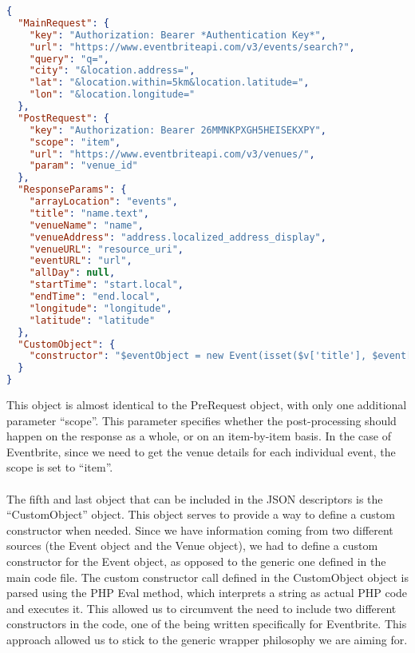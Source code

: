 \begin{lstlisting}[language=json,firstnumber=1]
{
  "MainRequest": {
    "key": "Authorization: Bearer *Authentication Key*",
    "url": "https://www.eventbriteapi.com/v3/events/search?",
    "query": "q=",
    "city": "&location.address=",
    "lat": "&location.within=5km&location.latitude=",
    "lon": "&location.longitude="
  },
  "PostRequest": {
    "key": "Authorization: Bearer 26MMNKPXGH5HEISEKXPY",
    "scope": "item",
    "url": "https://www.eventbriteapi.com/v3/venues/",
    "param": "venue_id"
  },
  "ResponseParams": {
    "arrayLocation": "events",
    "title": "name.text",
    "venueName": "name",
    "venueAddress": "address.localized_address_display",
    "venueURL": "resource_uri",
    "eventURL": "url",
    "allDay": null,
    "startTime": "start.local",
    "endTime": "end.local",
    "longitude": "longitude",
    "latitude": "latitude"
  },
  "CustomObject": {
    "constructor": "$eventObject = new Event(isset($v['title'], $event[$v['title']]) ? $event[$v['title']] : '', isset($v['venueName'], $postObject[$v['venueName']]) ? $postObject[$v['venueName']] : '', isset($v['venueAddress'], $postObject[$v['venueAddress']]) ? $postObject[$v['venueAddress']] : '', isset($v['venueURL'], $postObject[$v['venueURL']]) ? $postObject[$v['venueURL']] : '', isset($v['eventURL'], $event[$v['eventURL']]) ? $event[$v['eventURL']] : '', isset($v['allDay'], $event[$v['allDay']]) ? $event[$v['allDay']] : '', isset($v['startTime'], $event[$v['startTime']]) ? $event[$v['startTime']] : '', isset($v['endTime'], $event[$v['endTime']]) ? $event[$v['endTime']] : '', isset($v['latitude'], $postObject[$v['latitude']]) ? $postObject[$v['latitude']] : '', isset($v['longitude'], $postObject[$v['longitude']]) ? $postObject[$v['longitude']] : '');"
  }
}
\end{lstlisting}
This object is almost identical to the PreRequest object, with only one additional parameter ``scope''. This parameter specifies whether the post-processing should happen on the response as a whole, or on an item-by-item basis. In the case of Eventbrite, since we need to get the venue details for each individual event, the scope is set to ``item''.\\\\
The fifth and last object that can be included in the JSON descriptors is the ``CustomObject'' object. This object serves to provide a way to define a custom constructor when needed. Since we have information coming from two different sources (the Event object and the Venue object), we had to define a custom constructor for the Event object, as opposed to the generic one defined in the main code file. The custom constructor call defined in the CustomObject object is parsed using the PHP Eval method, which interprets a string as actual PHP code and executes it. This allowed us to circumvent the need to include two different constructors in the code, one of the being written specifically for Eventbrite. This approach allowed us to stick to the generic wrapper philosophy we are aiming for.
\newpage
